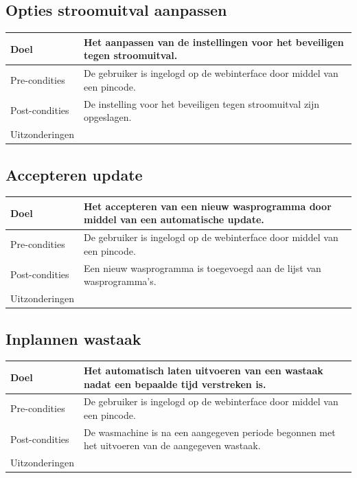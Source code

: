 \subsection{Opties stroomuitval aanpassen}
\begin{center}
  \begin{tabular}{ | p{4cm} | p{8.5cm} | }    \hline
    Doel & Het aanpassen van de instellingen voor het beveiligen tegen stroomuitval. \\ \hline
    Pre-condities & De gebruiker is ingelogd op de webinterface door middel van een pincode. \\ \hline
    Post-condities & De instelling voor het beveiligen tegen stroomuitval zijn opgeslagen. \\ \hline
    Uitzonderingen &  \\
    \hline
  \end{tabular}
\end{center}

\subsection{Accepteren update}
\begin{center}
  \begin{tabular}{ | p{4cm} | p{8.5cm} | }    \hline
    Doel & Het accepteren van een nieuw wasprogramma door middel van een automatische update. \\ \hline
    Pre-condities & De gebruiker is ingelogd op de webinterface door middel van een pincode. \\ \hline
    Post-condities & Een nieuw wasprogramma is toegevoegd aan de lijst van wasprogramma's. \\ \hline
    Uitzonderingen &  \\
    \hline
  \end{tabular}
\end{center}

\subsection{Inplannen wastaak}
\begin{center}
  \begin{tabular}{ | p{4cm} | p{8.5cm} | }    \hline
    Doel & Het automatisch laten uitvoeren van een wastaak nadat een bepaalde tijd verstreken is. \\ \hline
    Pre-condities & De gebruiker is ingelogd op de webinterface door middel van een pincode. \\ \hline
    Post-condities & De wasmachine is na een aangegeven periode begonnen met het uitvoeren van de aangegeven wastaak. \\ \hline
    Uitzonderingen &  \\
    \hline
  \end{tabular}
\end{center}

